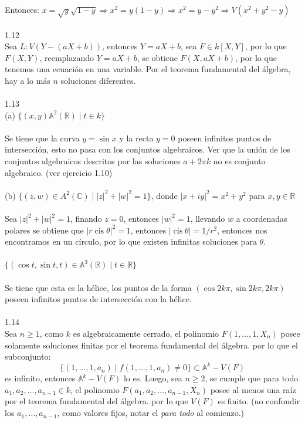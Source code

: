 \documentclass{article}
\newcommand{\R}{\mathbb{R}}
\newcommand{\A}{\mathbb{A}}
\begin{document}
\\
\\
Entonces: $x=\sqrt{y}\sqrt{1-y} \Longrightarrow x^{2}=y(1-y) \Longrightarrow x^{2}=y-y^{2} \Longrightarrow V(x^{2}+y^{2}-y)$
\\
\\
1.12
\\
Sea $L: V(Y-(aX+b))$, entonces $Y=aX+b$, sea $F \in k[X,Y]$, por lo que $F(X,Y)$, reemplazando $Y=aX+b$, se obtiene $F(X,aX+b)$, por lo que tenemos una ecuación en una variable. Por el teorema fundamental del álgebra, hay a lo más $n$ soluciones diferentes.
\\
\\
1.13
\\
(a) $\{(x,y) \A^{2}(\R) \mid t \in k\}$
\\
\\
Se tiene que la curva $y=\sin{x}$ y la recta $y=0$ poseen infinitos puntos de intersección, esto no pasa con los conjuntos algebraicos. Ver que la unión de los conjuntos algebraicos descritos por las soluciones $a+2 \pi k$ no es conjunto algebraico. (ver ejercicio 1.10)
\\
\\
(b) $\{(z,w) \in A^{2}(\mathbb{C}) \mid |z|^2+|w|^2 =1\}$, donde $|x+iy|^{2}=x^2 +y^2$ para $x,y \in \R$
\\
\\
Sea $|z|^{2} + |w|^{2}=1$, finando $z=0$, entonces $|w|^{2}=1$, llevando $w$ a coordenadas polares se obtiene que $|r \operatorname{cis}\theta|^{2} =1$, entonces $|\operatorname{cis}{\theta}|=1/r^{2}$, entonces nos encontramos en un círculo, por lo que existen infinitas soluciones para $\theta$.
\\
\\
$\{(\cos{t},\sin{t},t) \in \A^{3}(\R) \mid t \in \R \}$
\\
\\
Se tiene que esta es la hélice, los puntos de la forma $(\cos{2k \pi}, \sin{2k \pi}, 2k \pi)$ poseen infinitos puntos de intersección con la hélice.
\\
\\
1.14
\\
Sea $n \geq 1$, como $k$ es algebraicamente cerrado, el polinomio $F(1,\dots,1,X_n)$ posee solamente soluciones finitas por el teorema fundamental del álgebra. por lo que el subconjunto:
\begin{equation*}
    \{(1,\dots , 1,a_n) \mid f(1,\dots,1,a_n) \neq 0 \} \subset \A^{k}-V(F)
\end{equation*}
es infinito, entonces $\A^{k}-V(F)$ lo es. Luego, sea $n \geq 2$, se cumple que para todo $a_1,a_2,\dots,a_{n-1} \in k$, el polinomio $F(a_1,a_2,\dots,a_{n-1},X_{n})$ posee al menos una raíz por el teorema fundamental del álgebra. por lo que $V(F)$ es finito. (no confundir los $a_1,\dots,a_{n-1}$, como valores fijos, notar el \textit{para todo} al comienzo.) 
\end{document}
